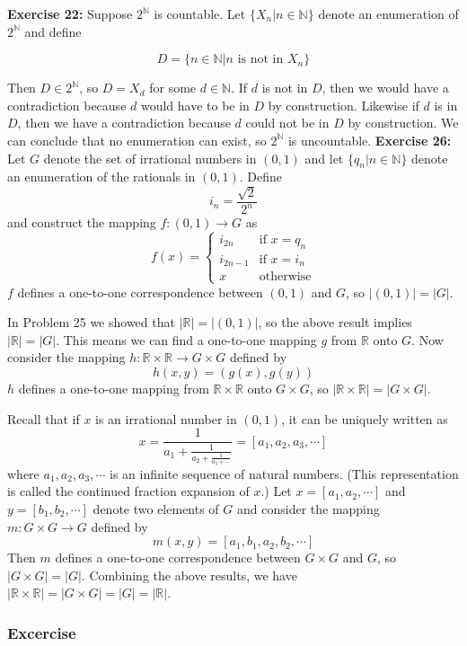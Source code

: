 \textbf{Exercise 22:}
Suppose $2^{\mathbb{N}}$ is countable. Let $\{X_n | n \in \mathbb{N}\}$ denote an enumeration of $2^{\mathbb{N}}$ and define

\[ D = \{ n \in \mathbb{N} | n \text{ is not in } X_n \} \]

Then $D \in 2^{\mathbb{N}}$, so $D = X_d$ for some $d \in \mathbb{N}$. If $d$ is not in $D$, then we would have a contradiction because $d$ would have to be in $D$ by construction. Likewise if $d$ is in $D$, then we have a contradiction because $d$ could not be in $D$ by construction. We can conclude that no enumeration can exist, so $2^{\mathbb{N}}$ is uncountable.
\textbf{Exercise 26:} Let $G$ denote the set of irrational numbers in $(0, 1)$ and let $\{q_n | n \in \mathbb{N}\}$ denote an enumeration of the rationals in $(0, 1)$. Define
\[ i_n = \frac{\sqrt{2}}{2^n} \]
and construct the mapping $f: (0, 1) \rightarrow G$ as
\[ f(x) = \begin{cases} i_{2n} & \text{if } x = q_n \\ i_{2n-1} & \text{if } x = i_n \\ x & \text{otherwise} \end{cases} \]
$f$ defines a one-to-one correspondence between $(0, 1)$ and $G$, so $|(0, 1)| = |G|$.

In Problem 25 we showed that $|\mathbb{R}| = |(0, 1)|$, so the above result implies $|\mathbb{R}| = |G|$. This means we can find a one-to-one mapping $g$ from $\mathbb{R}$ onto $G$. Now consider the mapping $h: \mathbb{R} \times \mathbb{R} \rightarrow G \times G$ defined by
\[ h(x, y) = (g(x), g(y)) \]
$h$ defines a one-to-one mapping from $\mathbb{R} \times \mathbb{R}$ onto $G \times G$, so $|\mathbb{R} \times \mathbb{R}| = |G \times G|$.

Recall that if $x$ is an irrational number in $(0, 1)$, it can be uniquely written as
\[ x = \frac{1}{a_1 + \frac{1}{a_2 + \frac{1}{a_3 + \cdots}}} = [a_1, a_2, a_3, \cdots] \]
where $a_1, a_2, a_3, \cdots$ is an infinite sequence of natural numbers. (This representation is called the continued fraction expansion of $x$.) Let $x = [a_1, a_2, \cdots]$ and $y = [b_1, b_2, \cdots]$ denote two elements of $G$ and consider the mapping $m: G \times G \rightarrow G$ defined by
\[ m(x, y) = [a_1, b_1, a_2, b_2, \cdots] \]
Then $m$ defines a one-to-one correspondence between $G \times G$ and $G$, so $|G \times G| = |G|$. Combining the above results, we have $|\mathbb{R} \times \mathbb{R}| = |G \times G| = |G| = |\mathbb{R}|$.
\subsubsection{Excercise}